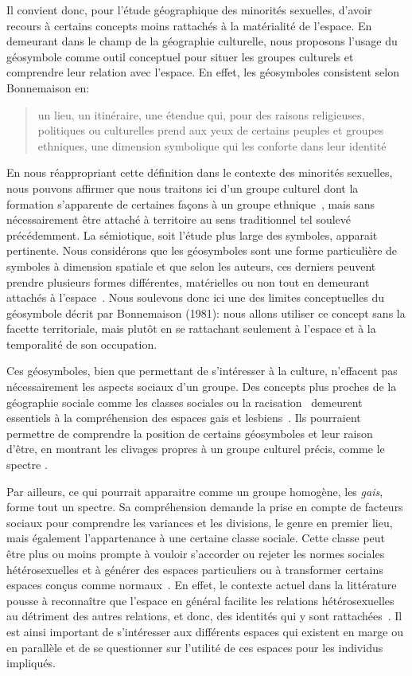 Il convient donc, pour l'étude géographique des minorités sexuelles, d'avoir recours à certains concepts moins rattachés à la matérialité de l'espace.
En demeurant dans le champ de la géographie culturelle, nous proposons l'usage du géosymbole comme outil conceptuel pour situer les groupes culturels et comprendre leur relation avec l'espace.
En effet, les géosymboles consistent selon Bonnemaison en: \blockquote[{\cite[256]{Bonnemaison1981}}][.]{\textelp{} un lieu, un  itinéraire, une étendue qui, pour des raisons religieuses, politiques ou   culturelles prend aux yeux de certains peuples et groupes ethniques, une   dimension symbolique qui les conforte dans leur identité }.
En nous réappropriant cette définition dans le contexte des minorités sexuelles, nous pouvons affirmer que nous traitons ici d'un groupe culturel dont la formation s'apparente de certaines façons à un groupe ethnique~\citep{Sinfield1996}, mais sans nécessairement être attaché à territoire au sens traditionnel tel soulevé précédemment.
La sémiotique, soit l'étude plus large des symboles, apparait pertinente.
Nous considérons que les géosymboles sont une forme particulière de symboles à dimension spatiale et que selon les auteurs, ces derniers peuvent prendre plusieurs formes différentes, matérielles ou non tout en demeurant attachés à l'espace~\citep{Bonnemaison1981,Bedard2002}.
Nous soulevons donc ici une des limites conceptuelles du géosymbole décrit par Bonnemaison (1981): nous allons utiliser ce concept sans la facette territoriale, mais plutôt en se rattachant seulement à l'espace et à la temporalité de son occupation.

Ces géosymboles, bien que permettant de s'intéresser à la culture, n'effacent pas nécessairement les aspects sociaux d'un groupe.
Des concepts plus proches de la géographie sociale comme les classes sociales ou la racisation~\citep{Bonniol2005} demeurent essentiels à la compréhension des espaces gais et lesbiens~\citep[93]{Oswin2008}.
Ils pourraient permettre de comprendre la position de certains géosymboles et leur raison d'être, en montrant les clivages propres à un groupe culturel précis, comme le spectre \lgbt{}.

Par ailleurs, ce qui pourrait apparaitre comme un groupe homogène, les \emph{gais}, forme tout un spectre.
Sa compréhension demande la prise en compte de facteurs sociaux pour comprendre les variances et les divisions, le genre en premier lieu, mais également l'appartenance à une certaine classe sociale.
Cette classe peut être plus ou moins prompte à vouloir s'accorder ou rejeter les normes sociales hétérosexuelles et à générer des espaces particuliers ou à transformer certains espaces conçus comme normaux~\citep{Lewis2011}.
En effet, le contexte actuel dans la littérature pousse à reconnaître que l'espace en général facilite les relations hétérosexuelles au détriment des autres relations, et donc, des identités qui y sont rattachées~\citep{Brown2003}.
Il est ainsi important de s'intéresser aux différents espaces qui existent en marge ou en parallèle et de se questionner sur l'utilité de ces espaces pour les individus impliqués.

